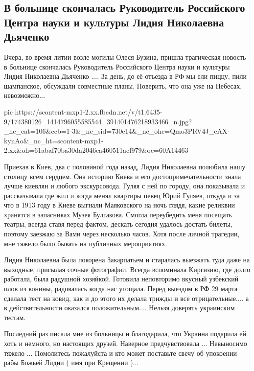  
 
 
 
 
\subsection{В больнице скончалась Руководитель Российского Центра науки и культуры Лидия Николаевна Дьяченко}
\label{sec:17_04_2021.fb.berezhnaja_elena.1.buzina_mogila_smert_djachenko_lidia}

Вчера, во время литии возле могилы Олеся Бузина, пришла трагическая новость - в
больнице скончалась Руководитель Российского Центра науки и культуры Лидия
Николаевна Дьяченко .... За день, до её отъезда в РФ мы ели пиццу, пили
шампанское, обсуждали совместные планы. Поверить, что она уже на Небесах,
невозможно... 

\ifcmt
  pic https://scontent-mxp1-2.xx.fbcdn.net/v/t1.6435-9/174380126_1414796055585544_391401476218933466_n.jpg?_nc_cat=106&ccb=1-3&_nc_sid=730e14&_nc_ohc=Qmo3PRV4J_cAX-kynAo&_nc_ht=scontent-mxp1-2.xx&oh=61abaf70ba30da2046ea460511acf979&oe=60A14463
\fi

Приехав в Киев, два с половиной года назад, Лидия Николаевна полюбила нашу
столицу всем сердцем. Она историю Киева и его достопримечательности знала лучше
киевлян и любого экскурсовода. Гуляя с ней по городу, она показывала и
рассказывала где жил и когда менял квартиры певец Юрий Гуляев, откуда и за что
в 1913 году в Киеве выгнали Маяковского на ночь глядя, какие реликвии хранятся
в запасниках Музея Булгакова. Смогла переубедить меня посещать театры, всегда
ставя перед фактом, дескать сегодня удалось достать билеты, поэтому заезжаю за
Вами через несколько часов. Хотя после личной трагедии, мне тяжело было бывать
на публичных мероприятиях. 

Лидия Николаевна была покорена Закарпатьем и старалась выезжать туда даже на
выходные, присылая сочные фотографии. Всегда вспоминала Киргизию, где долго
работала, была радушной хозяйкой. Готовила неповторимо вкусный узбекский плов
из конины, радовалась когда нас угощала. Перед выездом в РФ 29 марта сделала
тест на ковид, как и до этого их делала трижды и все отрицательные.... а в
действительности оказался положительным.... Нельзя доверять украинским тестам. 

Последний раз писала мне из больницы и благодарила, что Украина подарила ей
хоть и немного, но настоящих друзей. Наверное предчувствовала ... Невыносимо
тяжело ... Помолитесь пожалуйста и кто может поставьте свечу об упокоении рабы
Божьей Лидии ( имя при Крещении )...
